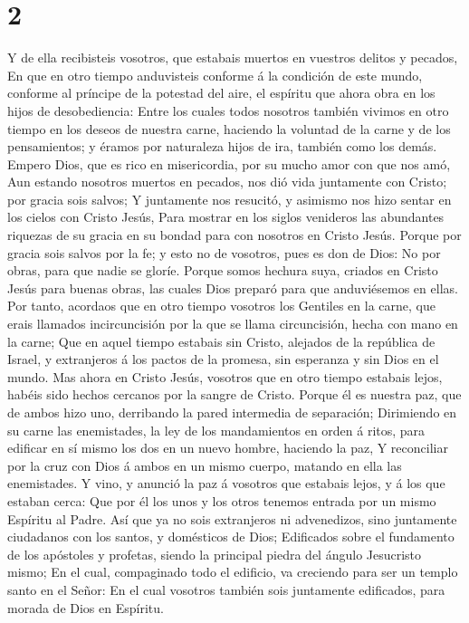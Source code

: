 \hypertarget{section-1}{%
\section{2}\label{section-1}}

 Y de ella recibisteis vosotros, que estabais muertos en
vuestros delitos y pecados,  En que en otro tiempo
anduvisteis conforme á la condición de este mundo, conforme al príncipe
de la potestad del aire, el espíritu que ahora obra en los hijos de
desobediencia:  Entre los cuales todos nosotros también
vivimos en otro tiempo en los deseos de nuestra carne, haciendo la
voluntad de la carne y de los pensamientos; y éramos por naturaleza
hijos de ira, también como los demás.  Empero Dios, que es
rico en misericordia, por su mucho amor con que nos amó, 
Aun estando nosotros muertos en pecados, nos dió vida juntamente con
Cristo; por gracia sois salvos;  Y juntamente nos resucitó,
y asimismo nos hizo sentar en los cielos con Cristo Jesús, 
Para mostrar en los siglos venideros las abundantes riquezas de su
gracia en su bondad para con nosotros en Cristo Jesús. 
Porque por gracia sois salvos por la fe; y esto no de vosotros, pues es
don de Dios:  No por obras, para que nadie se gloríe.
 Porque somos hechura suya, criados en Cristo Jesús para
buenas obras, las cuales Dios preparó para que anduviésemos en ellas.
 Por tanto, acordaos que en otro tiempo vosotros los
Gentiles en la carne, que erais llamados incircuncisión por la que se
llama circuncisión, hecha con mano en la carne;  Que en
aquel tiempo estabais sin Cristo, alejados de la república de Israel, y
extranjeros á los pactos de la promesa, sin esperanza y sin Dios en el
mundo.  Mas ahora en Cristo Jesús, vosotros que en otro
tiempo estabais lejos, habéis sido hechos cercanos por la sangre de
Cristo.  Porque él es nuestra paz, que de ambos hizo uno,
derribando la pared intermedia de separación;  Dirimiendo
en su carne las enemistades, la ley de los mandamientos en orden á
ritos, para edificar en sí mismo los dos en un nuevo hombre, haciendo la
paz,  Y reconciliar por la cruz con Dios á ambos en un
mismo cuerpo, matando en ella las enemistades.  Y vino, y
anunció la paz á vosotros que estabais lejos, y á los que estaban cerca:
 Que por él los unos y los otros tenemos entrada por un
mismo Espíritu al Padre.  Así que ya no sois extranjeros ni
advenedizos, sino juntamente ciudadanos con los santos, y domésticos de
Dios;  Edificados sobre el fundamento de los apóstoles y
profetas, siendo la principal piedra del ángulo Jesucristo mismo;
 En el cual, compaginado todo el edificio, va creciendo
para ser un templo santo en el Señor:  En el cual vosotros
también sois juntamente edificados, para morada de Dios en Espíritu.

